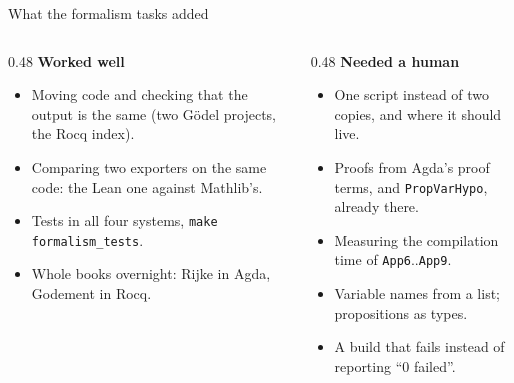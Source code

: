 \documentclass[10pt,aspectratio=169]{beamer}
\newcommand{\bad}[1]{\textcolor{warn}{#1}}
\newcommand{\ok}[1]{\textcolor{good}{#1}}
\begin{document}
\begin{frame}{What the formalism tasks added}
  \begin{columns}[T]
    \begin{column}{0.48\textwidth}
      \ok{\textbf{Worked well}}
      \begin{itemize}\small
        \item Moving code and checking that the output is the same (two Gödel projects, the
              Rocq index).
        \item Comparing two exporters on the same code: the Lean one against Mathlib's.
        \item Tests in all four systems, \texttt{make formalism\_tests}.
        \item Whole books overnight: Rijke in Agda, Godement in Rocq.
      \end{itemize}
    \end{column}
    \begin{column}{0.48\textwidth}
      \bad{\textbf{Needed a human}}
      \begin{itemize}\small
        \item One script instead of two copies, and where it should live.
        \item Proofs from Agda's proof terms, and \texttt{PropVarHypo}, already there.
        \item Measuring the compilation time of \texttt{App6}..\texttt{App9}.
        \item Variable names from a list; propositions as types.
        \item A build that fails instead of reporting ``0 failed''.
      \end{itemize}
    \end{column}
  \end{columns}
\end{frame}
\end{document}
